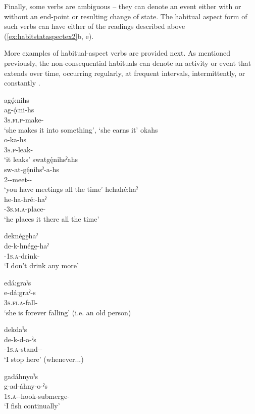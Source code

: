 Finally, some verbs are ambiguous -- they can denote an event either with or without an end-point or resulting change of state. The habitual aspect form of such verbs can have either of the readings described above (\ref{ex:habitstataspectex2}b, e).

More examples of habitual-aspect verbs are provided next. As mentioned previously, the non-consequential habituals can denote an activity or event that extends over time, occurring regularly, at frequent intervals, intermittently, or constantly . 

\ea\label{ex:habitaspectex2}
\ea agǫ́:nihs \\
\gll ag-ǫ́:ni-hs\\
 \textsc{3s.fi.p}-make-{\habitual}\\
\glt ‘she makes it into something’, `she earns it'
\ex okahs\\
\gll o-ka-hs\\
 \textsc{3s.p}-leak-{\habitual}\\
\glt `it leaks'
\ex swatgę́nihsˀahs\\
\gll sw-at-gę́nihsˀ-a-hs\\
 {2\pla}-{\semireflexive}-meet-{\joinerA}-{\habitual}\\
\glt `you have meetings all the time'
\ex hehahé:haˀ\\
\gll he-ha-hré:-haˀ\\
 {\translocative}-\textsc{3s.m.a}-place-{\habitual}\\
\glt `he places it there all the time'

\ex deknége̱haˀ \\
\gll de-k-hnége̱-haˀ\\
{\dualic}-\textsc{1s.a}-drink-{\habitual}\\
\glt ‘I don’t drink any more’

\ex edá:graˀs\\
\gll e-dá:graˀ-s\\
\textsc{3s.fi.a}-fall-{\habitual}\\
\glt ‘she is forever falling’ (i.e. an old person)


\ex dekdaˀs\\
\gll de-k-d-a-ˀs\\
{\dualic}-\textsc{1s.a}-stand-{\joinerA}-{\habitual}\\
\glt ‘I stop here’ (whenever...)

\ex gadáhnyoˀs\\
\gll g-ad-áhny-o-ˀs\\
 \textsc{1s.a}-{\semireflexive}-hook-submerge-{\habitual}\\
\glt `I fish continually'

